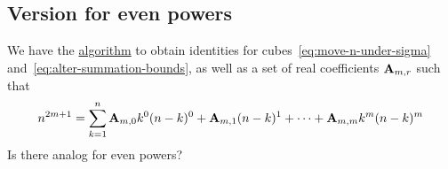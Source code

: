 ﻿\subsection{Version for even powers}\label{subsec:even_powers}
We have the \hyperref[itm:cubes-algorithm]{algorithm} to obtain identities for
cubes~\eqref{eq:move-n-under-sigma} and~\eqref{eq:alter-summation-bounds}, as well as
a set of real coefficients ${\mathbf{A}} \sb{m,r}$ such that
\begin{align*}
    n^{2m+1} = \sum_{k=1}^{n} {\mathbf{A}} \sb{m,0} k^0 (n-k)^0 + {\mathbf{A}} \sb{m,1} (n-k)^1
    + \cdots + {\mathbf{A}} \sb{m,m} k^m (n-k)^m
\end{align*}
Is there analog for even powers?

